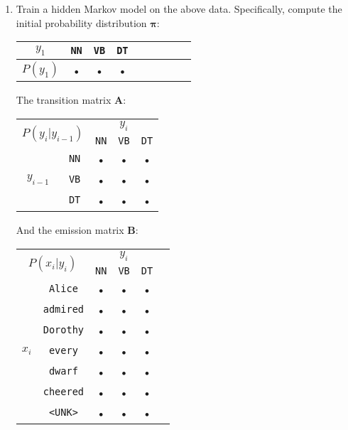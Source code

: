 \documentclass[11pt,letterpaper]{article}
\begin{document}
\begin{enumerate}

\item Train a hidden Markov model on the above data. Specifically, compute the initial probability distribution $\mathbf{\pi}$:
\begin{center}
\begin{tabular}{|c|c|c|c|c|c|c|c|c|}
\hline 
$y_1$ & \texttt{NN} & \texttt{VB} & \texttt{DT} \\ 
\hline 
$P(y_1)$ & • & • & • \\ 
\hline 
\end{tabular}
\end{center}

\vspace{11pt}

The transition matrix $\mathbf{A}$:
\begin{center}
\begin{tabular}{|c|c|c|c|c|}
\hline 
\multicolumn{2}{|c|}{\multirow{2}{*}{$P(y_i|y_{i-1})$}} & \multicolumn{3}{|c|}{$y_i$} \\ 
\cline{3-5}
\multicolumn{2}{|c|}{} & \texttt{NN} & \texttt{VB} & \texttt{DT} \\ 
\hline 
\multirow{3}{*}{$y_{i-1}$} & \texttt{NN} & • & • & • \\ 
\cline{2-5}
& \texttt{VB} & • & • & • \\ 
\cline{2-5}
& \texttt{DT} & • & • & • \\ 
\hline 
\end{tabular} 
\end{center}

\vspace{11pt}\newpage

And the emission matrix $\mathbf{B}$:
\begin{center}
\begin{tabular}{|c|c|c|c|c|c|}
\hline 
\multicolumn{2}{|c|}{\multirow{2}{*}{$P(x_i|y_i)$}} & \multicolumn{3}{|c|}{$y_i$} \\ 
\cline{3-5}
\multicolumn{2}{|c|}{} & \texttt{NN} & \texttt{VB} & \texttt{DT} \\ 
\hline 
\multirow{7}{*}{$x_i$} & \texttt{Alice} & • & • & • \\ 
\cline{2-5}
& \texttt{admired} & • & • & • \\ 
\cline{2-5}
& \texttt{Dorothy} & • & • & • \\ 
\cline{2-5}
& \texttt{every} & • & • & • \\ 
\cline{2-5}
& \texttt{dwarf} & • & • & • \\ 
\cline{2-5}
& \texttt{cheered} & • & • & • \\ 
\cline{2-5}
& \texttt{<UNK>} & • & • & • \\ 
\hline 
\end{tabular} 
\end{center}


\end{enumerate}
\end{document}
